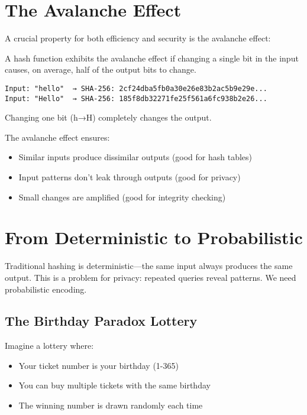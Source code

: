 \section{The Avalanche Effect}

A crucial property for both efficiency and security is the avalanche effect:

\begin{definition}
A hash function exhibits the avalanche effect if changing a single bit in the input causes, on average, half of the output bits to change.
\end{definition}

\begin{example}
\begin{verbatim}
Input: "hello"  → SHA-256: 2cf24dba5fb0a30e26e83b2ac5b9e29e...
Input: "Hello"  → SHA-256: 185f8db32271fe25f561a6fc938b2e26...
\end{verbatim}
Changing one bit (h→H) completely changes the output.
\end{example}

The avalanche effect ensures:
\begin{itemize}
\item Similar inputs produce dissimilar outputs (good for hash tables)
\item Input patterns don't leak through outputs (good for privacy)
\item Small changes are amplified (good for integrity checking)
\end{itemize}

\section{From Deterministic to Probabilistic}

Traditional hashing is deterministic—the same input always produces the same output. This is a problem for privacy: repeated queries reveal patterns. We need probabilistic encoding.

\subsection{The Birthday Paradox Lottery}

Imagine a lottery where:
\begin{itemize}
\item Your ticket number is your birthday (1-365)
\item You can buy multiple tickets with the same birthday
\item The winning number is drawn randomly each time
\end{itemize}

